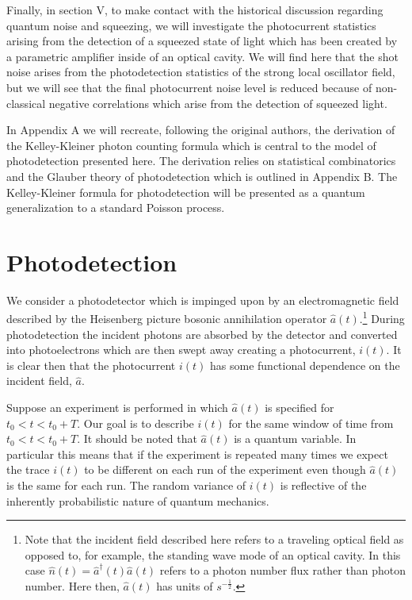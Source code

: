 \documentclass[12pt]{article}
\begin{document}
Finally, in section V, to make contact with the historical discussion regarding quantum noise and squeezing, we will investigate the photocurrent statistics arising from the detection of a squeezed state of light which has been created by a parametric amplifier inside of an optical cavity. We will find here that the shot noise arises from the photodetection statistics of the strong local oscillator field, but we will see that the final photocurrent noise level is reduced because of non-classical negative correlations  which arise from the detection of squeezed light.

In Appendix A we will recreate, following the original authors, the derivation of the Kelley-Kleiner photon counting formula which is central to the model of photodetection presented here. The derivation relies on statistical combinatorics and the Glauber theory of photodetection which is outlined in Appendix B. The Kelley-Kleiner formula for photodetection will be presented as a quantum generalization to a standard Poisson process.

\section{Photodetection}

We consider a photodetector which is impinged upon by an electromagnetic field described by the Heisenberg picture bosonic annihilation operator $\hat{a}(t)$.\footnote{Note that the incident field described here refers to a traveling optical field as opposed to, for example, the standing wave mode of an optical cavity. In this case $\hat{n}(t) = \hat{a}^{\dag}(t) \hat{a}(t)$ refers to a photon number flux rather than photon number. Here then, $\hat{a}(t)$ has units of $s^{-\frac{1}{2}}$.} During photodetection the incident photons are absorbed by the detector and converted into photoelectrons which are then swept away creating a photocurrent, $i(t)$. It is clear then that the photocurrent $i(t)$ has some functional dependence on the incident field, $\hat{a}$.

Suppose an experiment is performed in which $\hat{a}(t)$ is specified for $t_0<t<t_0+T$. Our goal is to describe $i(t)$ for the same window of time from $t_0<t<t_0+T$. It should be noted that $\hat{a}(t)$ is a quantum variable. In particular this means that if the experiment is repeated many times we expect the trace $i(t)$ to be different on each run of the experiment even though $\hat{a}(t)$ is the same for each run. The random variance of $i(t)$ is reflective of the inherently probabilistic nature of quantum mechanics.
\end{document}
